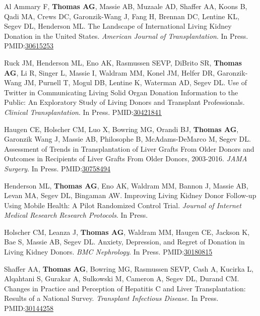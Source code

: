 \documentclass[10pt]{article}
\makeatletter
\newlength{\bibhang}
\newlength{\bibsep}
 {\@listi \global\bibsep\itemsep \global\advance\bibsep by\parsep}
\newenvironment{bibenum*}
  {\renewcommand\labelenumi{[\theenumi]}%
   \etaremune[
     topsep=0pt,
     itemsep=\bibsep,
     parsep=0pt,partopsep=0pt,
     itemindent=-\bibhang,
     leftmargin={\bibhang+\widthof{[999]}}]}
  {\endetaremune}
\newcommand{\pmid}[1]{PMID:\href{https://www.ncbi.nlm.nih.gov/pubmed/#1}{#1}}
\makeatother
\begin{document}
\begin{bibenum*}
\item Al Ammary F\dag, \textbf{Thomas AG\dag}, Massie AB, Muzaale AD,
  Shaffer AA, Koons B, Qadi MA, Crews DC, Garonzik-Wang J,
  Fang H, Brennan DC, Lentine KL, Segev DL, Henderson ML.
  The Landscape of International Living Kidney Donation in the United States.
  \emph{American Journal of Transplantation}. In Press.
  \pmid{30615253} 

\item Ruck JM\dag, Henderson ML\dag, Eno AK, Rasmussen SEVP,
  DiBrito SR, \textbf{Thomas AG}, Li R, Singer L, Massie I, Waldram MM,
  Konel JM, Helfer DR, Garonzik-Wang JM, Purnell T,
  Mogul DB, Lentine K, Waterman AD, Segev DL.
  Use of Twitter in Communicating Living Solid Organ Donation Information
  to the Public: An Exploratory Study of Living Donors and
  Transplant Professionals.
  \emph{Clinical Transplantation}. In Press.
  \pmid{30421841} 

\item Haugen CE, Holscher CM, Luo X, Bowring MG, Orandi BJ, \textbf{Thomas AG},
  Garonzik Wang J, Massie AB, Philosophe B, McAdams-DeMarco M, Segev DL.
  Assessment of Trends in Transplantation of Liver Grafts From Older Donors
  and Outcomes in Recipients of Liver Grafts From Older Donors, 2003-2016.
  \emph{JAMA Surgery}. In Press.
  \pmid{30758494} 

\item Henderson ML, \textbf{Thomas AG}, Eno AK, Waldram MM, Bannon J,
  Massie AB, Levan MA, Segev DL, Bingaman AW.
  Improving Living Kidney Donor Follow-up Using Mobile Health:
  A Pilot Randomized Control Trial.
  \emph{Journal of Internet Medical Research Research Protocols}. In Press.

\item Holscher CM, Leanza J, \textbf{Thomas AG}, Waldram MM, Haugen CE,
  Jackson K, Bae S, Massie AB, Segev DL. Anxiety, Depression, and
  Regret of Donation in Living Kidney Donors.
  \emph{BMC Nephrology}. In Press.
  \pmid{30180815} 

\item Shaffer AA, \textbf{Thomas AG}, Bowring MG, Rasmussen SEVP,
  Cash A, Kucirka L, Alqahtani S, Gurakar A, Sulkowski M, Cameron A,
  Segev DL, Durand CM. Changes in Practice and Perception of Hepatitis
  C and Liver Transplantation: Results of a National Survey.
  \emph{Transplant Infectious Disease}. In Press.
  \pmid{30144258} 


\end{bibenum*}
\end{document}
